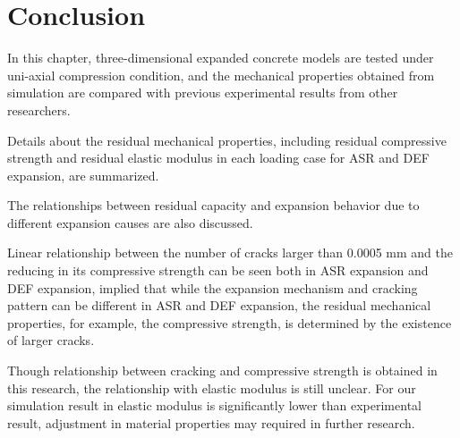 \section{Conclusion}

In this chapter, three-dimensional expanded concrete models are tested under uni-axial compression condition, and the mechanical properties obtained from simulation are compared with previous experimental results from other researchers.

Details about the residual mechanical properties, including residual compressive strength and residual elastic modulus in each loading case for ASR and DEF expansion, are summarized.

The relationships between residual capacity and expansion behavior due to different expansion causes are also discussed.

Linear relationship between the number of cracks larger than 0.0005 mm and the reducing in its compressive strength can be seen both in ASR expansion and DEF expansion, implied that while the expansion mechanism and cracking pattern can be different in ASR and DEF expansion, the residual mechanical properties, for example, the compressive strength, is determined by the existence of larger cracks.

Though relationship between cracking and compressive strength is obtained in this research, the relationship with elastic modulus is still unclear. For our simulation result in elastic modulus is significantly lower than experimental result, adjustment in material properties may required in further research.
